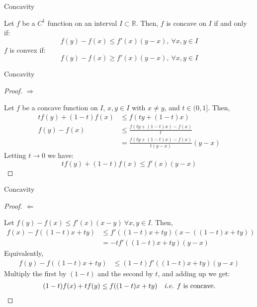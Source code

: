 \documentclass[aspectratio=169]{beamer}
\begin{document}
\begin{frame}{Concavity}
    \begin{theorem}
        Let $f$ be a $C^1$ function on an interval $I\subset \mathbb{R}$. Then, $f$ is concave on $I$ if and only if:
        \[f(y)-f(x)\leq f'(x)(y-x),\ \forall x,y\in I\]
        $f$ is convex if:
        \[f(y)-f(x)\geq f'(x)(y-x),\ \forall x,y\in I\]
    \end{theorem}
    
\end{frame}

\begin{frame}{Concavity}
    \begin{proof}
        \(\Rightarrow\)

        Let $f$ be a concave function on $I$, $x,y\in I$ with $x\neq y$, and $t\in(0,1]$. Then,
        \begin{align*}
            tf(y)+(1-t)f(x)&\leq f(ty+(1-t)x)\\
            f(y)-f(x)&\leq \frac{f(ty+(1-t)x)-f(x)}{t}\\
            &=\frac{f(ty+(1-t)x)-f(x)}{t(y-x)}(y-x)
        \end{align*}
        Letting $t\rightarrow 0$ we have:
        \[tf(y)+(1-t)f(x)\leq f'(x)(y-x)\]

    \end{proof}    
\end{frame}

\begin{frame}{Concavity}
    \begin{proof}
        \(\Leftarrow\)

        Let $f(y)-f(x)\leq f'(x)(x-y)\ \forall x,y\in I$. Then,
        \begin{align*}
            f(x)-f((1-t)x+ty)&\leq f'((1-t)x+ty)(x-((1-t)x+ty))\\
            &= -tf'((1-t)x+ty)(y-x)
        \end{align*}
        Equivalently,
        \begin{align*}
            f(y)-f((1-t)x+ty)&\leq (1-t)f'((1-t)x+ty)(y-x)
        \end{align*}
        Multiply the first by $(1-t)$ and the second by $t$, and adding up we get:
        \begin{align*}
            (1-t)f(x)+tf(y)\leq f((1-t)x+ty)\quad \text{\textit{i.e.} $f$ is concave.}
        \end{align*}

    \end{proof}
\end{frame}
\end{document}

